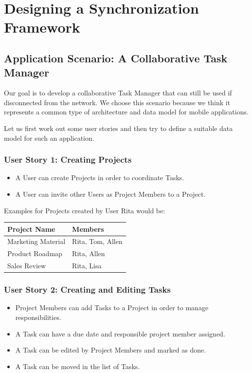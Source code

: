 
\chapter{Designing a Synchronization Framework}\label{main}

\section{Application Scenario: A Collaborative Task Manager}
Our goal is to develop a collaborative Task Manager that can still be used if disconnected from the network.
We choose this scenario because we think it represents a common type of architecture and data model for mobile applications.

Let us first work out some user stories and then try to define a suitable data model for such an application.

\subsection{User Story 1: Creating Projects}
\begin{itemize}
\item A User can create Projects in order to coordinate Tasks.
\item A User can invite other Users as Project Members to a Project.
\end{itemize}

Examples for Projects created by User Rita would be:\\

\begin{tabular}{ l l }
Project Name & Members \\
\hline
Marketing Material & Rita, Tom, Allen \\
Product Roadmap & Rita, Allen \\
Sales Review & Rita, Lisa
\end{tabular}

\subsection{User Story 2: Creating and Editing Tasks}
\begin{itemize}
\item Project Members can add Tasks to a Project in order to manage responsibilities.
\item A Task can have a due date and responsible project member assigned.
\item A Task can be edited by Project Members and marked as done.
\item A Task can be moved in the list of Tasks.
\end{itemize}

